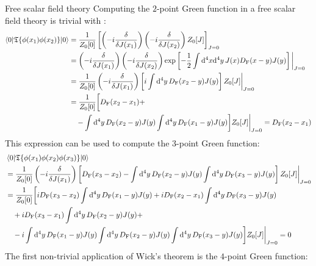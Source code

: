 \begin{example}{Free scalar field theory}{}
  Computing the $ 2 $-point Green function in a free scalar field theory is trivial with :
  \begin{equation*}
    \begin{split}
      \braket{0 | \mathfrak{T}\{\phi(x_1) \phi(x_2)\} | 0}
      & = \frac{1}{Z_0[0]} \left[ \left( -i \frac{\delta}{\delta J(x_1)} \right) \left( -i \frac{\delta}{\delta J(x_2)} \right) Z_0[J] \right]_{J = 0} \\
      & = \left( -i \frac{\delta}{\delta J(x_1)} \right) \left( -i \frac{\delta}{\delta J(x_2)} \right) \exp \left[ - \frac{1}{2} \int \mathrm{d}^4x \mathrm{d}^4y\, J(x) D_\text{F}(x-y) J(y) \right] \bigg\vert_{J = 0} \\
      & = \frac{1}{Z_0[0]} \left( -i \frac{\delta}{\delta J(x_1)} \right) \left[ i \int \mathrm{d}^4y\, D_\text{F}(x_2 - y) J(y) \right] Z_0[J] \bigg\vert_{J = 0} \\
      & = \frac{1}{Z_0[0]} \bigg[ D_\text{F}(x_2 - x_1) + \\
      & \quad - \int \mathrm{d}^4y\, D_\text{F}(x_2 - y) J(y) \int \mathrm{d}^4y\, D_\text{F}(x_1 - y) J(y) \bigg] Z_0[J] \bigg\vert_{J = 0} = D_\text{F}(x_2 - x_1)
    \end{split}
  \end{equation*}
  This expression can be used to compute the $ 3 $-point Green function:
  \begin{equation*}
    \begin{split}
      & \braket{0 | \mathfrak{T}\{\phi(x_1) \phi(x_2) \phi(x_3)\} | 0} \\
      & = \frac{1}{Z_0[0]} \left( -i \frac{\delta}{\delta J(x_1)} \right) \left[ D_\text{F}(x_3 - x_2) - \int \mathrm{d}^4y\, D_\text{F}(x_2 - y) J(y) \int \mathrm{d}^4y\, D_\text{F}(x_3 - y) J(y) \right] Z_0[J] \bigg\vert_{J = 0} \\
      & = \frac{1}{Z_0[0]} \bigg[ i D_\text{F}(x_3 - x_2) \int \mathrm{d}^4y\, D_\text{F}(x_1 - y) J(y) + i D_\text{F}(x_2 - x_1) \int \mathrm{d}^4y\, D_\text{F}(x_3 - y) J(y) \\
      & \quad + i D_\text{F}(x_3 - x_1) \int \mathrm{d}^4y\, D_\text{F}(x_2 - y) J(y) + \\
      & \quad - i \int \mathrm{d}^4y\, D_\text{F}(x_1 - y) J(y) \int \mathrm{d}^4y\, D_\text{F}(x_2 - y) J(y) \int \mathrm{d}^4y\, D_\text{F}(x_3 - y) J(y) \bigg] Z_0[J] \bigg\vert_{J = 0} = 0
    \end{split}
  \end{equation*}
  The first non-trivial application of Wick's theorem is the $ 4 $-point Green function:

\end{example}
